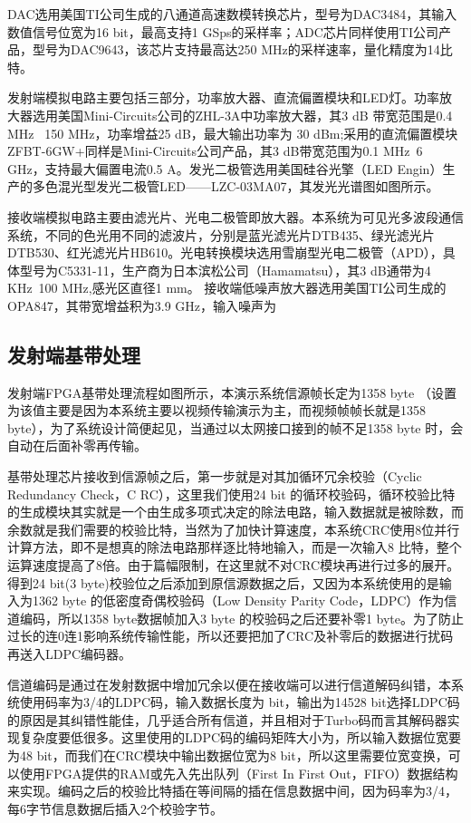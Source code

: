 DAC选用美国TI公司生成的八通道高速数模转换芯片，型号为DAC3484，其输入数值信号位宽为16 bit，最高支持1 GSps的采样率；ADC芯片同样使用TI公司产品，型号为DAC9643，该芯片支持最高达250 MHz的采样速率，量化精度为14比特。

发射端模拟电路主要包括三部分，功率放大器、直流偏置模块和LED灯。功率放大器选用美国Mini-Circuits公司的ZHL-3A中功率放大器，其3 dB 带宽范围是0.4 MHz ~150 MHz，功率增益25 dB，最大输出功率为 30 dBm;采用的直流偏置模块ZFBT-6GW+同样是Mini-Circuits公司产品，其3 dB带宽范围为0.1 MHz~6 GHz，支持最大偏置电流0.5 A。发光二极管选用美国硅谷光擎（LED Engin）生产的多色混光型发光二极管LED——LZC-03MA07，其发光光谱图如图所示。

接收端模拟电路主要由滤光片、光电二极管即放大器。本系统为可见光多波段通信系统，不同的色光用不同的滤波片，分别是蓝光滤光片DTB435、绿光滤光片DTB530、红光滤光片HB610。光电转换模块选用雪崩型光电二极管（APD），具体型号为C5331-11，生产商为日本滨松公司（Hamamatsu），其3 dB通带为4 KHz~100 MHz,感光区直径1 mm。 接收端低噪声放大器选用美国TI公司生成的OPA847，其带宽增益积为3.9 GHz，输入噪声为
\subsection{发射端基带处理}
发射端FPGA基带处理流程如图所示，本演示系统信源帧长定为1358 byte （设置为该值主要是因为本系统主要以视频传输演示为主，而视频帧帧长就是1358 byte），为了系统设计简便起见，当通过以太网接口接到的帧不足1358 byte 时，会自动在后面补零再传输。

基带处理芯片接收到信源帧之后，第一步就是对其加循环冗余校验（Cyclic Redundancy Check，C RC），这里我们使用24 bit 的循环校验码，循环校验比特的生成模块其实就是一个由生成多项式决定的除法电路，输入数据就是被除数，而余数就是我们需要的校验比特，当然为了加快计算速度，本系统CRC使用8位并行计算方法，即不是想真的除法电路那样逐比特地输入，而是一次输入8 比特，整个运算速度提高了8倍。由于篇幅限制，在这里就不对CRC模块再进行过多的展开。得到24 bit(3 byte)校验位之后添加到原信源数据之后，又因为本系统使用的是输入为1362 byte 的低密度奇偶校验码（Low Density Parity Code，LDPC）作为信道编码，所以1358 byte数据帧加入3 byte 的校验码之后还要补零1 byte。为了防止过长的连0连1影响系统传输性能，所以还要把加了CRC及补零后的数据进行扰码再送入LDPC编码器。

信道编码是通过在发射数据中增加冗余以便在接收端可以进行信道解码纠错，本系统使用码率为3/4的LDPC码，输入数据长度为 bit，输出为14528 bit选择LDPC码的原因是其纠错性能佳，几乎适合所有信道，并且相对于Turbo码而言其解码器实现复杂度要低很多。这里使用的LDPC码的编码矩阵大小为，所以输入数据位宽要为48 bit，而我们在CRC模块中输出数据位宽为8 bit，所以这里需要位宽变换，可以使用FPGA提供的RAM或先入先出队列（First In First Out，FIFO）数据结构来实现。编码之后的校验比特插在等间隔的插在信息数据中间，因为码率为3/4，每6字节信息数据后插入2个校验字节。

